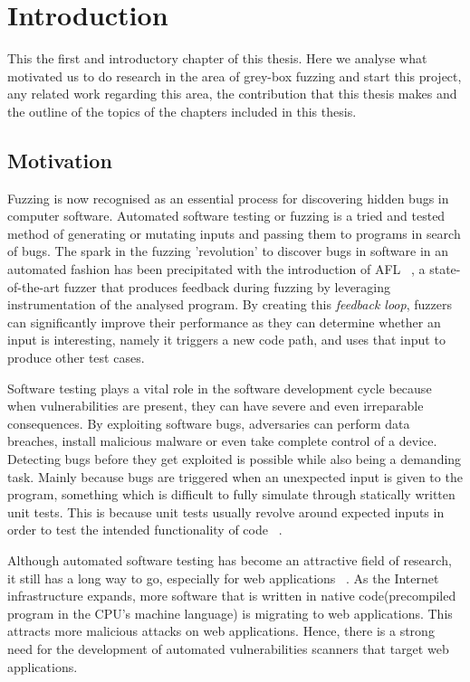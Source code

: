 \chapter{Introduction}
\minitoc
\vspace*{1cm}

This the first and introductory chapter of this thesis. Here we analyse what motivated us to do research in the area of grey-box fuzzing and start this project, any related work regarding this area, the contribution that this thesis makes and the outline of the topics of the chapters included in this thesis.

\section{Motivation}
Fuzzing is now recognised as an essential process for discovering hidden bugs in computer software. Automated software testing or fuzzing is a tried and tested method of generating or mutating inputs and passing them to programs in search of bugs. The spark in the fuzzing 'revolution' to discover bugs in software in an automated fashion has been precipitated with the introduction of AFL ~\cite{zalewski2015american}, a state-of-the-art fuzzer that produces feedback during fuzzing by leveraging instrumentation of the analysed program. By creating this \textit{feedback loop}, fuzzers can significantly improve their performance as they can determine whether an input is interesting, namely it triggers a new code path, and uses that input to produce other test cases.

Software testing plays a vital role in the software development cycle because when vulnerabilities are present, they can have severe and even irreparable consequences. By exploiting software bugs, adversaries can perform data breaches, install malicious malware or even take complete control of a device. Detecting bugs before they get exploited is possible while also being a demanding task. Mainly because bugs are triggered when an unexpected input is given to the program, something which is difficult to fully simulate through statically written unit tests. This is because unit tests usually revolve around expected inputs in order to test the intended functionality of code ~\cite{aschermann2019nautilus}.

Although automated software testing has become an attractive field of research, it still has a long way to go, especially for web applications ~\cite{doupe2010johnny}. As the Internet infrastructure expands, more software that is written in native code(precompiled program in the CPU's machine language) is migrating to web applications. This attracts more malicious attacks on web applications. Hence, there is a strong need for the development of automated vulnerabilities scanners that target web applications.
 
